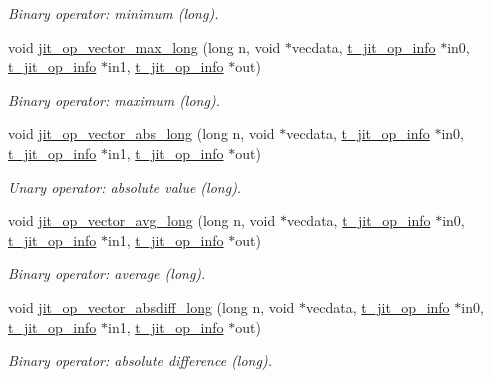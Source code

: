 \begin{DoxyCompactItemize}
\begin{DoxyCompactList}\small\item\em Binary operator: minimum (long). \item\end{DoxyCompactList}\item 
void \hyperlink{group__opvecmod_gad4e50db9a86b53204f8d1ff8305aedd0}{jit\_\-op\_\-vector\_\-max\_\-long} (long n, void $\ast$vecdata, \hyperlink{structt__jit__op__info}{t\_\-jit\_\-op\_\-info} $\ast$in0, \hyperlink{structt__jit__op__info}{t\_\-jit\_\-op\_\-info} $\ast$in1, \hyperlink{structt__jit__op__info}{t\_\-jit\_\-op\_\-info} $\ast$out)
\begin{DoxyCompactList}\small\item\em Binary operator: maximum (long). \item\end{DoxyCompactList}\item 
void \hyperlink{group__opvecmod_ga80b59aa6c97eabedf5e4f5973e8530ed}{jit\_\-op\_\-vector\_\-abs\_\-long} (long n, void $\ast$vecdata, \hyperlink{structt__jit__op__info}{t\_\-jit\_\-op\_\-info} $\ast$in0, \hyperlink{structt__jit__op__info}{t\_\-jit\_\-op\_\-info} $\ast$in1, \hyperlink{structt__jit__op__info}{t\_\-jit\_\-op\_\-info} $\ast$out)
\begin{DoxyCompactList}\small\item\em Unary operator: absolute value (long). \item\end{DoxyCompactList}\item 
void \hyperlink{group__opvecmod_gafab6512b1e7755dde911fbb7dc2c2f3f}{jit\_\-op\_\-vector\_\-avg\_\-long} (long n, void $\ast$vecdata, \hyperlink{structt__jit__op__info}{t\_\-jit\_\-op\_\-info} $\ast$in0, \hyperlink{structt__jit__op__info}{t\_\-jit\_\-op\_\-info} $\ast$in1, \hyperlink{structt__jit__op__info}{t\_\-jit\_\-op\_\-info} $\ast$out)
\begin{DoxyCompactList}\small\item\em Binary operator: average (long). \item\end{DoxyCompactList}\item 
void \hyperlink{group__opvecmod_ga07a76e07019b86d5e0cc26f7113f756d}{jit\_\-op\_\-vector\_\-absdiff\_\-long} (long n, void $\ast$vecdata, \hyperlink{structt__jit__op__info}{t\_\-jit\_\-op\_\-info} $\ast$in0, \hyperlink{structt__jit__op__info}{t\_\-jit\_\-op\_\-info} $\ast$in1, \hyperlink{structt__jit__op__info}{t\_\-jit\_\-op\_\-info} $\ast$out)
\begin{DoxyCompactList}\small\item\em Binary operator: absolute difference (long). \item\end{DoxyCompactList}\item 

\end{DoxyCompactItemize}
